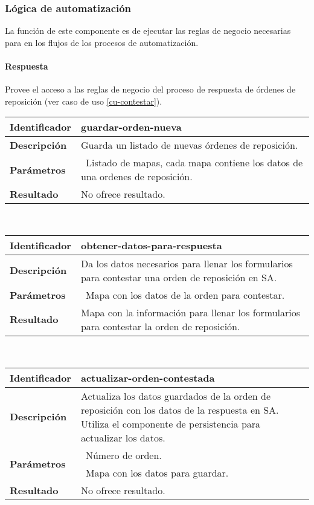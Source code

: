 \subsubsection{Lógica de automatización}
La función de este componente es de ejecutar las reglas de negocio necesarias para en los flujos de los procesos de automatización.  
\paragraph{Respuesta\\}
Provee el acceso a las reglas de negocio del proceso de respuesta de órdenes de reposición (ver caso de uso \ref{cu-contestar}).
	\vspace{5mm}\\
	\begin{tabular}{|p{}|p{}|}
		\hline
		\textbf{Identificador}	& \textbf{guardar-orden-nueva}\\
		\hline
		\hline
		\textbf{Descripción}	& Guarda un listado de nuevas órdenes de reposición.\\
		\hline
		\textbf{Parámetros}		& \textbullet\, Listado de mapas, cada mapa contiene los datos de una ordenes de reposición.\\
		\hline
		\textbf{Resultado}		& No ofrece resultado.\\
		\hline
	\end{tabular}
	\vspace{5mm}\\
	\begin{tabular}{|p{}|p{}|}
		\hline
		\textbf{Identificador}	& \textbf{obtener-datos-para-respuesta}\\
		\hline
		\hline
		\textbf{Descripción}	& Da los datos necesarios para llenar los formularios para contestar una orden de reposición en SA.\\
		\hline
		\textbf{Parámetros}		& \textbullet\, Mapa con los datos de la orden para contestar.\\
		\hline
		\textbf{Resultado}		& Mapa con la información para llenar los formularios para contestar la orden de reposición.\\
		\hline
	\end{tabular}
	\vspace{5mm}\\
	\begin{tabular}{|p{}|p{}|}
		\hline
		\textbf{Identificador}	& \textbf{actualizar-orden-contestada}\\
		\hline
		\hline
		\textbf{Descripción}	& Actualiza los datos guardados de la orden de reposición con los datos de la respuesta en SA. Utiliza el componente de persistencia para actualizar los datos.\\
		\hline
		\multirow{2}{*}{\textbf{Parámetros}}	& \textbullet\, Número de orden.\\
												& \textbullet\, Mapa con los datos para guardar.\\
		\hline
		\textbf{Resultado}		& No ofrece resultado.\\
		\hline
	\end{tabular}

